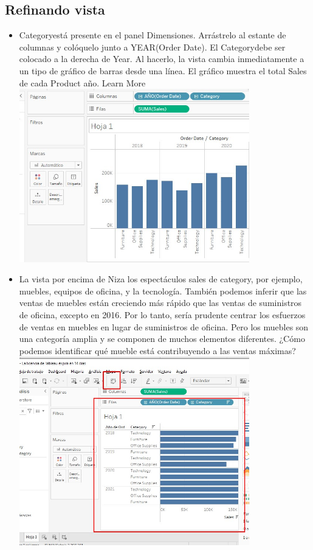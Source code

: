 \documentclass[preprint,12pt]{elsarticle}
\begin{document}
		\subsection{Refinando vista}
		\begin{itemize}
			\item Categoryestá presente en el panel Dimensiones. Arrástrelo al estante de columnas y colóquelo
			junto a YEAR(Order Date). El Categorydebe ser colocado a la derecha de Year. Al
			hacerlo, la vista cambia inmediatamente a un tipo de gráfico de barras desde una línea. El
			gráfico muestra el total Sales de cada Product año.
			Learn More
			\\	\includegraphics[width=10cm]{./IMAGENES/3.3.1}
			\item La vista por encima de Niza los espectáculos sales de category, por ejemplo, muebles, equipos
			de oficina, y la tecnología. También podemos inferir que las ventas de muebles están creciendo más
			rápido que las ventas de suministros de oficina, excepto en 2016. Por lo tanto, sería prudente centrar los
			esfuerzos de ventas en muebles en lugar de suministros de oficina. Pero los muebles son una categoría
			amplia y se componen de muchos elementos diferentes. ¿Cómo podemos identificar qué mueble está
			contribuyendo a las ventas máximas?
			\\	\includegraphics[width=10cm]{./IMAGENES/3.3.1.2}
		
			
			
		\end{itemize}
\end{document}
